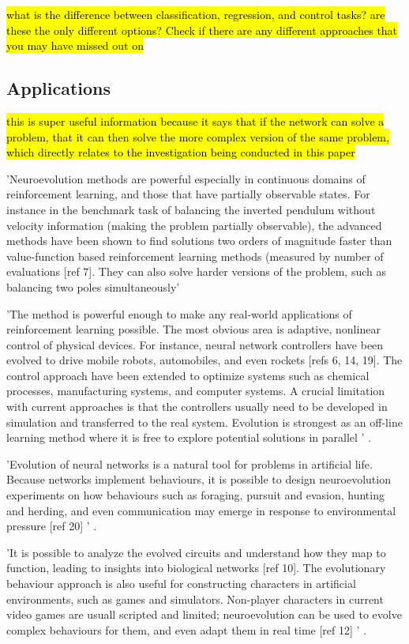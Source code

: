 \hl{what is the difference between classification, regression, and control tasks? are these the only different options? Check if there are any different approaches that you may have missed out on}


\subsection{Applications}

\hl{this is super useful information because it says that if the network can solve a problem, that it can then solve the more complex version of the same problem, which directly relates to the investigation being conducted in this paper}

'Neuroevolution methods are powerful especially in continuous domains of reinforcement learning, and those that have partially observable states. For instance in the benchmark task of balancing the inverted pendulum without velocity information (making the problem partially observable), the advanced methods have been shown to find solutions two orders of magnitude faster than value-function based reinforcement learning methods (measured by number of evaluations [ref 7]. They can also solve harder versions of the problem, such as balancing two poles simultaneously'

'The method is powerful enough to make any real-world applications of reinforcement learning possible. The most obvious area is adaptive, nonlinear control of physical devices. For instance, neural network controllers have been evolved to drive mobile robots, automobiles, and even rockets [refs 6, 14, 19]. The control approach have been extended to optimize systems such as chemical processes, manufacturing systems, and computer systems. A crucial limitation with current approaches is that the controllers usually need to be developed in simulation and transferred to the real system. Evolution is strongest as an off-line learning method where it is free to explore potential solutions in parallel ' \cite{Miikkulainen2010}.

'Evolution of neural networks is a natural tool for problems in artificial life. Because networks implement behaviours, it is possible to design neuroevolution experiments on how behaviours such as foraging, pursuit and evasion, hunting and herding, and even communication may emerge in response to environmental pressure [ref 20] ' \cite{Miikkulainen2010}.

'It is possible to analyze the evolved circuits and understand how they map to function, leading to insights into biological networks [ref 10]. The evolutionary behaviour approach is also useful for constructing characters in artificial environments, such as games and simulators. Non-player characters in current video games are usuall scripted and limited; neuroevolution can be used to evolve complex behaviours for them, and even adapt them in real time [ref 12] ' \cite{Miikkulainen2010}.






